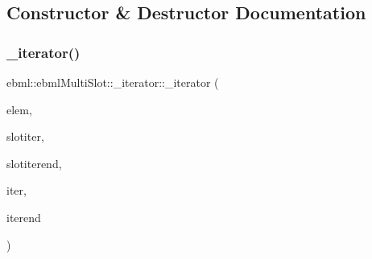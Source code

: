 \subsection{Constructor \& Destructor Documentation}
\mbox{\label{classebml_1_1ebmlMultiSlot_1_1__iterator_ad4c2e04a5cf2b94c9abb9a14bf64f017}} 
\subsubsection{\texorpdfstring{\+\_\+iterator()}{\_iterator()}\hspace{0.1cm}{\footnotesize\ttfamily [1/3]}}
{\footnotesize\ttfamily ebml\+::ebml\+Multi\+Slot\+::\+\_\+iterator\+::\+\_\+iterator (\begin{DoxyParamCaption}\item[{const \mbox{\hyperlink{namespaceebml_adad533b7705a16bb360fe56380c5e7be}{ebml\+Element\+\_\+sp}} \&}]{elem,  }\item[{const std\+::vector$<$ \+\_\+slot\+\_\+t $>$\+::\mbox{\hyperlink{classebml_1_1ebmlMasterElement_1_1iterator}{iterator}} \&}]{slotiter,  }\item[{const std\+::vector$<$ \+\_\+slot\+\_\+t $>$\+::\mbox{\hyperlink{classebml_1_1ebmlMasterElement_1_1iterator}{iterator}} \&}]{slotiterend,  }\item[{const \mbox{\hyperlink{classebml_1_1slot__t_1_1iterator}{slot\+\_\+t\+::iterator}} \&}]{iter,  }\item[{const \mbox{\hyperlink{classebml_1_1slot__t_1_1iterator}{slot\+\_\+t\+::iterator}} \&}]{iterend }\end{DoxyParamCaption})\hspace{0.3cm}{\ttfamily [protected]}}

\mbox{\label{classebml_1_1ebmlMultiSlot_1_1__iterator_a74075a206c4d25bb335a79a4b471ef0b}} 

